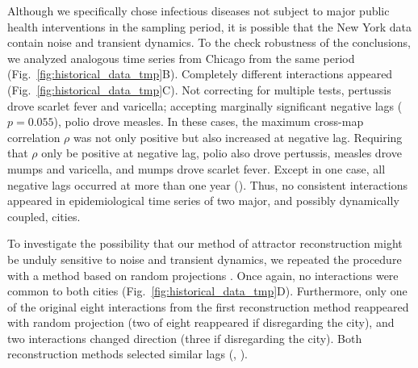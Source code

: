 \documentclass[10pt,letterpaper]{article}
\begin{document}
Although we specifically chose infectious diseases not subject to major public health interventions in the sampling period, it is possible that the New York data contain noise and transient dynamics.
To the check robustness of the conclusions, we analyzed analogous time series from Chicago from the same period (Fig.~\ref{fig:historical_data_tmp}B).
Completely different interactions appeared (Fig.~\ref{fig:historical_data_tmp}C).
Not correcting for multiple tests, pertussis drove scarlet fever and varicella; accepting marginally significant negative lags ($p=0.055$), polio drove measles.
In these cases, the maximum cross-map correlation $\rho$ was not only positive but also increased at negative lag.
Requiring that $\rho$ only be positive at negative lag, polio also drove pertussis, measles drove mumps and varicella, and mumps drove scarlet fever.
Except in one case, all negative lags occurred at more than one year ().
Thus, no consistent interactions appeared in epidemiological time series of two major, and possibly dynamically coupled, cities.

To investigate the possibility that our method of attractor reconstruction might be unduly sensitive to noise and transient dynamics, we repeated the procedure with a method based on random projections \cite{Tajima2015}.
Once again, no interactions were common to both cities (Fig.~\ref{fig:historical_data_tmp}D).
Furthermore, only one of the original eight interactions from the first reconstruction method reappeared with random projection (two of eight reappeared if disregarding the city), and two interactions changed direction (three if disregarding the city). 
Both reconstruction methods selected similar lags (, ).
\end{document}
